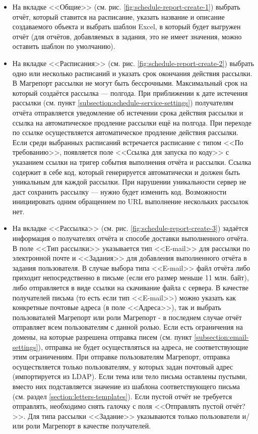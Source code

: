 \documentclass[../user-manual.tex]{subfiles}
\begin{document}
	\begin{itemize}
		\item На вкладке <<Общие>> (см. рис. \ref{fig:schedule-report-create-1}) выбрать отчёт, который ставится на расписание, указать название и описание создаваемого объекта и выбрать шаблон Excel, в который будет выгружен отчёт (для отчётов, добавляемых в задания, это не имеет значения, можно оставить шаблон по умолчанию).
		
		\item На вкладке <<Расписания>> (см. рис. \ref{fig:schedule-report-create-2}) выбрать одно или несколько расписаний и указать срок окончания действия рассылки. В Магрепорт рассылки не могут быть бессрочными. Максимальный срок на который создаётся рассылка --- полгода. При приближении к дате истечения рассылки (см. пункт \ref{subsection:schedule-service-settings}) получателям отчёта отправляется уведомление об истечении срока действия рассылки и ссылка на автоматическое продление рассылки ещё на полгода. При переходе по ссылке осуществляется автоматическое продление действия рассылки. Если среди выбранных расписаний встречается расписание с типом <<По требованию>>, появляется поле <<Ссылка для запуска по коду>> с указанием ссылки на тригер события выполнения отчёта и рассылки. Ссылка содержит в себе код, который генерируется автоматически и должен быть уникальным для каждой рассылки. При нарушении уникальности сервер не даст сохранить рассылку --- нужно будет изменить код. Возможности инициировать одним обращением по URL выполнение нескольких рассылок нет.
		
		\item На вкладке <<Рассылка>> (см. рис. \ref{fig:schedule-report-create-3}) задаётся информация о получателях отчёта и способе доставки выполненного отчёта. В поле <<Тип рассылки>> указывается тип <<E-mail>> для рассылки по электронной почте и <<Задания>> для добавления выполненного отчёта в задания пользователя. В случае выбора типа <<E-mail>> файл отчёта либо приходит непосредственно в письме (если его размер меньше 11 млн. байт), либо отправляется в виде ссылки на скачивание файла с сервера. В качестве получателей письма (то есть если тип <<E-mail>>) можно указать как конкретные почтовые адреса (в поле <<Адреса>>), так и выбрать пользоваталей Магрепорт или роли Магрепорт - в последнем случае отчёт отправляет всем пользователям с данной ролью. Если есть ограничения на домены, на которые разрешена отправка писем (см. пункт \ref{subsection:email-settings}), отправка не будет осуществляться на адреса, не соответствующие этим ограничениям. При отправке пользователям Магрепорт, отправка осуществляется только пользователям, у которых задан почтовый адрес (импортируется из LDAP). Если тема или тело письма оставлены пустыми, вместо них подставляется значение из шаблона соответствующего письма (см. раздел \ref{section:letters-templates}). Если пустой отчёт не требуется отправлять, необходимо снять галочку с поля <<Отправлять пустой отчёт?>>. Для типа рассылки <<Задание>> указываются только пользователи и/или роли Магрепорт в качестве получателей.
		

\end{itemize}
\end{document}
